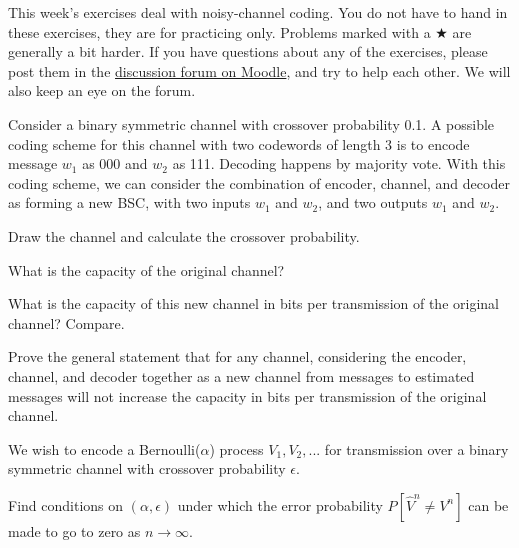 \documentclass[a4paper,10pt,landscape,twocolumn]{scrartcl}
\begin{document}
\practiceproblems

{\sffamily\noindent
This week's exercises deal with noisy-channel coding. You do not have to hand in these exercises, they are for practicing only. Problems marked with a $\bigstar$ are generally a bit harder. If you have questions about any of the exercises, please post them in the \href{https://www.moodle.ch/lms/mod/forum/view.php?id=1761}{discussion forum on Moodle}, and try to help each other. We will also keep an eye on the forum.
}

\begin{exercise}
Consider a binary symmetric channel with crossover probability 0.1. A possible coding scheme for this channel with two codewords of length 3 is to encode message $w_1$ as 000 and $w_2$ as 111. Decoding happens by majority vote. With this coding scheme, we can consider the combination of encoder, channel, and decoder as forming a new BSC, with two inputs $w_1$ and $w_2$, and two outputs $w_1$ and $w_2$.

\begin{subex}
Draw the channel and calculate the crossover probability.
\end{subex}

\begin{subex}
What is the capacity of the original channel?
\end{subex}

\begin{subex}
What is the capacity of this new channel in bits per transmission of the original channel? Compare.
\end{subex}

\begin{subex}
Prove the general statement that for any channel, considering the encoder, channel, and decoder together as a new channel from messages to estimated messages will not increase the capacity in bits per transmission of the original channel.
\end{subex}

\end{exercise}

\begin{exercise}
We wish to encode a Bernoulli($\alpha$) process $V_1, V_2, ...$ for transmission over a binary symmetric channel with crossover probability $\epsilon$.
\begin{center}
\end{center}
Find conditions on $(\alpha,\epsilon)$ under which the error probability $P[\hat{V}^n \neq V^n]$ can be made to go to zero as $n \to \infty$.
\end{exercise}
\end{document}
